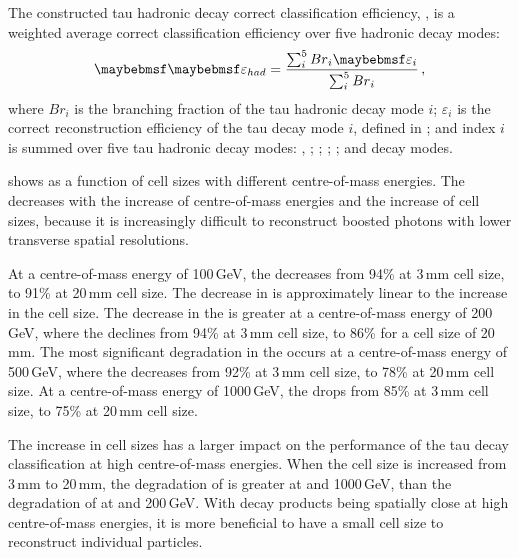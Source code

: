 The constructed tau hadronic decay correct classification efficiency, \tauHad, is a weighted average correct classification efficiency over five hadronic decay modes:
\begin{equation}
\tauHad = \frac{\sum_{i}^5 {Br}_{i}\varepsilon_{i}}{\sum_{i}^5 {Br}_{i}}  \,,
\label{eq:had}
\end{equation}
where $Br_{i}$ is the branching fraction of the tau  hadronic decay mode $i$; $\varepsilon_{i}$ is the correct reconstruction efficiency of the tau decay mode $i$, defined in ; and index $i$ is summed over five tau hadronic decay modes: , \decayPionShort; \decayRhoShortest; \decayAiPhotonShortest; \decayAiPionShortest; and \decayThreePionPhotonShort decay modes.

 shows \tauHad as a function of \ECAL cell sizes with different centre-of-mass energies. The \tauHad  decreases with the increase of centre-of-mass energies and the increase of \ECAL cell sizes, because it is increasingly difficult to reconstruct boosted photons with lower \ECAL transverse spatial resolutions.


At a centre-of-mass energy of 100\,GeV, the \tauHad decreases from 94\% at 3\,mm \ECAL cell size, to 91\% at 20\,mm \ECAL cell size. The decrease in \tauHad is approximately linear to the increase in the cell size. The decrease in the \tauHad is greater at a centre-of-mass energy of 200\,GeV, where the \tauHad declines from 94\% at 3\,mm cell size, to 86\% for a  cell size of  20\,mm. The most significant degradation in the \tauHad occurs at  a centre-of-mass energy of 500\,GeV, where the \tauHad decreases from 92\% at 3\,mm cell size, to 78\% at 20\,mm cell size. At a centre-of-mass energy of 1000\,GeV, the \tauHad drops from 85\% at 3\,mm cell size, to 75\% at 20\,mm cell size.


The increase in \ECAL cell sizes has a larger impact on the performance of the tau decay classification at high centre-of-mass energies. When the cell size is increased from 3\,mm to 20\,mm, the degradation of \tauHad is greater at  and 1000\,GeV, than the degradation  of \tauHad at  and 200\,GeV. With decay products being spatially close at high centre-of-mass energies, it is more beneficial to have a small \ECAL cell size to reconstruct individual particles.

